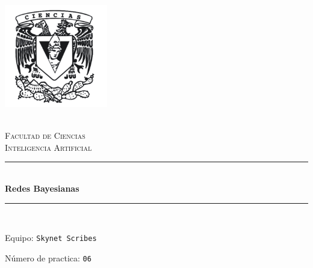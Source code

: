 \begin{titlepage}
\center 
\newcommand{\HRule}{\rule{\linewidth}{0.5mm}} 

\includegraphics[width=4.5cm]{IMA/cienciasWhite.png}

\quad \\[0.2cm]
\textsc{\huge Facultad de Ciencias}\\[.6cm] 
\textsc{\huge Inteligencia Artificial}\\[0.5cm]

\makeatletter
    \HRule \\ [0.4cm]
        { \huge \bfseries Redes Bayesianas}\\
    \HRule \\ [0.4cm]
    
\vspace{2mm}

\begin{flushleft}
    \Large{Equipo:} \texttt{\Large Skynet Scribes}
\end{flushleft}
\begin{flushleft}
    \Large{Número de practica:} \texttt{\Large 06}\\[0.8cm]
\end{flushleft}


\begin{minipage}{0.8\textwidth}
    \begin{flushright}
            
    \end{flushright}
\end{minipage}    


\end{titlepage}
